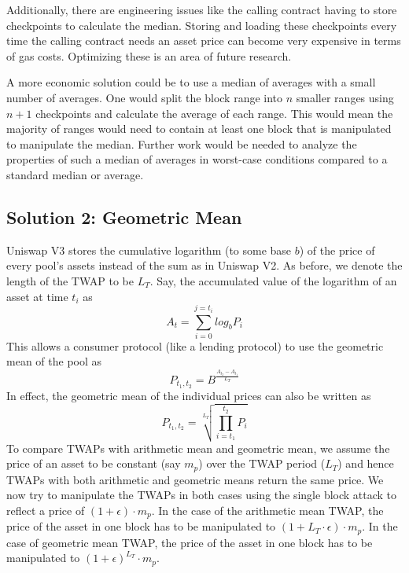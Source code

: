 Additionally, there are engineering issues like the calling contract having to store checkpoints to calculate the median. Storing and loading these checkpoints every time the calling contract needs an asset price can become very expensive in terms of gas costs. Optimizing these is an area of future research.

A more economic solution could be to use a median of averages with a small number of averages. One would split the block range into $n$ smaller ranges using $n+1$ checkpoints and calculate the average of each range. This would mean the majority of ranges would need to contain at least one block that is manipulated to manipulate the median. Further work would be needed to analyze the properties of such a median of averages in worst-case conditions compared to a standard median or average.

\subsection{Solution 2: Geometric Mean \label{sectionPotentialSolution2}}
Uniswap V3 stores the cumulative logarithm (to some base $b$) of the price of every pool's assets instead of the sum as in Uniswap V2. As before, we denote the length of the TWAP to be $L_T$. Say, the accumulated value of the logarithm of an asset at time $t_i$ as $$A_{t} = \sum_{i = 0}^{j = t_i}log_{b}P_i$$ This allows a consumer protocol (like a lending protocol) to use the geometric mean of the pool as
$$P_{{t_1},{t_2}} = B^{\frac{A_{t_2} - A_{t_1}}{L_T}}$$
In effect, the geometric mean of the individual prices can also be written as
$$P_{{t_1},{t_2}} = \sqrt[L_T]{\prod_{i=t_1}^{t_2} P_i}$$
To compare TWAPs with arithmetic mean and geometric mean, we assume the price of an asset to be constant (say $m_p$) over the TWAP period ($L_T$) and hence TWAPs with both arithmetic and geometric means return the same price. We now try to manipulate the TWAPs in both cases using the single block attack to reflect a price of $(1 + \epsilon)\cdot m_p$. In the case of the arithmetic mean TWAP, the price of the asset in one block has to be manipulated to $(1 + L_T \cdot \epsilon)\cdot m_p$. In the case of geometric mean TWAP, the price of the asset in one block has to be manipulated to $(1+\epsilon)^{L_T}\cdot m_p$.

